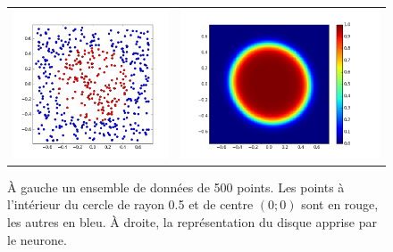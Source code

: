 \begin{figure}
\begin{center}
\begin{tabular}{cc}
\includegraphics[scale=0.35]{images/chapter1/disk_dataset.png} & \includegraphics[scale=0.35]{images/chapter1/disk_learned.png} \\
\end{tabular}
\caption{À gauche un ensemble de données de 500 points. Les points à l'intérieur du cercle de rayon 0.5 et de centre $(0; 0)$ sont en rouge, les autres en bleu. À droite, la représentation du disque apprise par le neurone.} 
\label{disque}
\end{center}
\end{figure}

